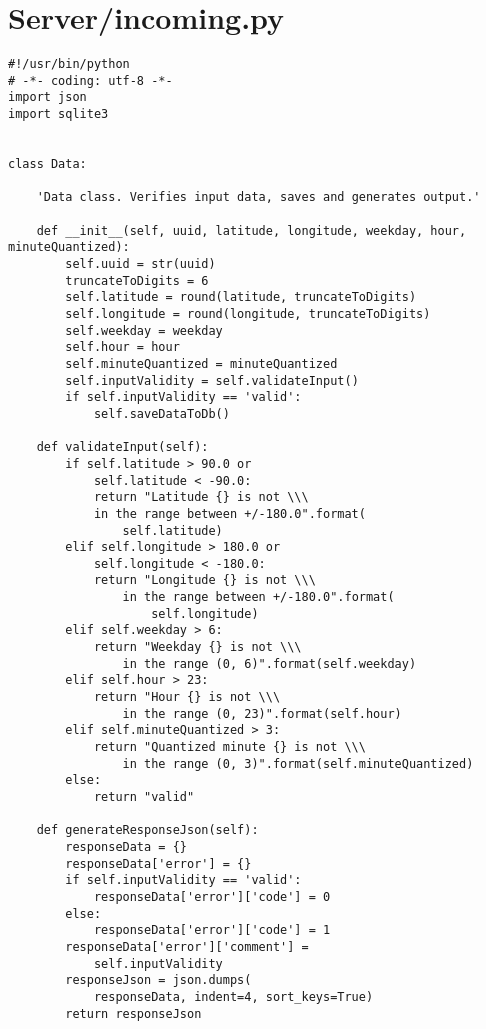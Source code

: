 \documentclass[conference]{IEEEtran}
\begin{document}
\section{Server/incoming.py}
\begin{lstlisting}
#!/usr/bin/python
# -*- coding: utf-8 -*-
import json
import sqlite3


class Data:

    'Data class. Verifies input data, saves and generates output.'

    def __init__(self, uuid, latitude, longitude, weekday, hour, minuteQuantized):
        self.uuid = str(uuid)
        truncateToDigits = 6
        self.latitude = round(latitude, truncateToDigits)
        self.longitude = round(longitude, truncateToDigits)
        self.weekday = weekday
        self.hour = hour
        self.minuteQuantized = minuteQuantized
        self.inputValidity = self.validateInput()
        if self.inputValidity == 'valid':
            self.saveDataToDb()

    def validateInput(self):
        if self.latitude > 90.0 or 
            self.latitude < -90.0:
            return "Latitude {} is not \\\
            in the range between +/-180.0".format(
                self.latitude)
        elif self.longitude > 180.0 or 
            self.longitude < -180.0:
            return "Longitude {} is not \\\
                in the range between +/-180.0".format(
                    self.longitude)
        elif self.weekday > 6:
            return "Weekday {} is not \\\
                in the range (0, 6)".format(self.weekday)
        elif self.hour > 23:
            return "Hour {} is not \\\
                in the range (0, 23)".format(self.hour)
        elif self.minuteQuantized > 3:
            return "Quantized minute {} is not \\\
                in the range (0, 3)".format(self.minuteQuantized)
        else:
            return "valid"

    def generateResponseJson(self):
        responseData = {}
        responseData['error'] = {}
        if self.inputValidity == 'valid':
            responseData['error']['code'] = 0
        else:
            responseData['error']['code'] = 1
        responseData['error']['comment'] = 
            self.inputValidity
        responseJson = json.dumps(
            responseData, indent=4, sort_keys=True)
        return responseJson


\end{lstlisting}
\end{document}
